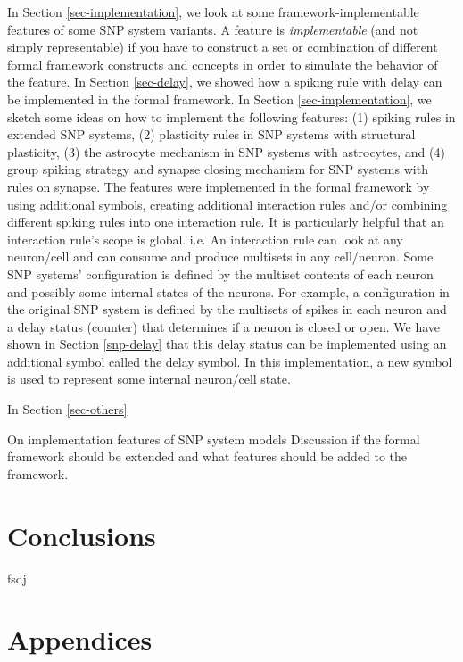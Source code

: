 \documentclass[a4paper]{article}
\theoremstyle{definition}
\begin{document}
In Section \ref{sec-implementation}, we look at some framework-implementable features of some SNP
system variants. A feature is \emph{implementable} (and not simply representable) if you have to
construct a set or combination of different formal framework constructs and concepts in order to 
simulate the behavior of the feature. In Section \ref{sec-delay}, we showed how a spiking rule with
delay can be implemented in the formal framework. In Section \ref{sec-implementation}, we sketch
some ideas on how to implement the following features: (1) spiking rules in extended SNP systems,
(2) plasticity rules in SNP systems with structural plasticity, (3) the astrocyte mechanism in
SNP systems with astrocytes, and (4) group spiking strategy and synapse closing mechanism for SNP
systems with rules on synapse. The features were implemented in the formal framework by using 
additional symbols, creating additional interaction rules and/or combining different spiking rules
into one interaction rule. It is particularly helpful that an interaction rule's scope is global.
i.e. An interaction rule can look at any neuron/cell and can consume and produce multisets in any
cell/neuron. Some SNP systems' configuration is defined by the multiset contents of each neuron and
possibly some internal states of the neurons. For example, a configuration in the original SNP system
is defined by the multisets of spikes in each neuron and a delay status (counter) that determines if 
a neuron is closed or open. We have shown in Section \ref{snp-delay} that this delay status can be
implemented using an additional symbol called the delay symbol. In this implementation, a new symbol
is used to represent some internal neuron/cell state. 

In Section \ref{sec-others}

On implementation features of SNP system models
Discussion if the formal framework should be extended and what features should be added
to the framework.

\section{Conclusions}

fsdj


\appendix{}

\section*{Appendices}\label{app}
\end{document}
